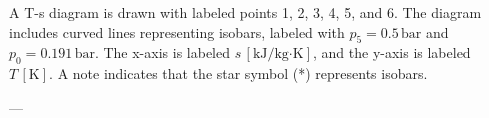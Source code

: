 A T-s diagram is drawn with labeled points 1, 2, 3, 4, 5, and 6. The diagram includes curved lines representing isobars, labeled with \( p_5 = 0.5 \, \text{bar} \) and \( p_0 = 0.191 \, \text{bar} \). The x-axis is labeled \( s \, [\text{kJ/kg·K}] \), and the y-axis is labeled \( T \, [\text{K}] \). A note indicates that the star symbol (*) represents isobars.

---